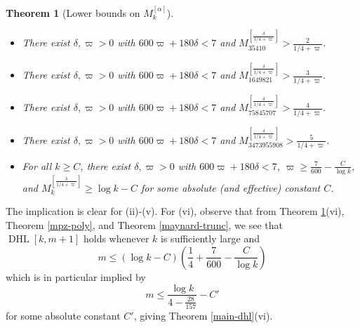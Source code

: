 \documentclass{bmcart}
\DeclareMathOperator*\DHL{DHL}
\theoremstyle{plain}
\newtheorem{theorem}{Theorem}[section]
\theoremstyle{definition}
\begin{document}
\begin{theorem}[Lower bounds on $M_k^{[\alpha]}$]\label{mlower-var}\
\begin{itemize}
\item[(ii)] There exist $\delta,\varpi>0$ with $600 \varpi + 180 \delta < 7$ and $M_{\num{35410}}^{[\frac{\delta}{1/4+\varpi}]} > \frac{2}{1/4+\varpi}$.
\item[(iii)] There exist $\delta,\varpi>0$ with $600 \varpi + 180 \delta < 7$ and $M_{\num{1649821}}^{[\frac{\delta}{1/4+\varpi}]} > \frac{3}{1/4+\varpi}$.
\item[(iv)] There exist $\delta,\varpi>0$ with $600 \varpi + 180 \delta < 7$ and $M_{\num{75845707}}^{[\frac{\delta}{1/4+\varpi}]} > \frac{4}{1/4+\varpi}$.
\item[(v)] There exist $\delta,\varpi>0$ with $600 \varpi + 180 \delta < 7$ and $M_{\num{3473955908}}^{[\frac{\delta}{1/4+\varpi}]} > \frac{5}{1/4+\varpi}$.
\item[(vi)] For all $k \geq C$, there exist $\delta,\varpi>0$ with $600 \varpi + 180 \delta < 7$, $\varpi \geq \frac{7}{600} - \frac{C}{\log k}$, and $M_k^{[\frac{\delta}{1/4+\varpi}]} \geq \log k - C$ for some absolute (and effective) constant $C$.
\end{itemize}
\end{theorem}

The implication is clear for (ii)-(v).  For (vi), observe that from Theorem \ref{mlower-var}(vi), Theorem \ref{mpz-poly}, and Theorem \ref{maynard-trunc}, we see that $\DHL[k,m+1]$ holds whenever $k$ is sufficiently large and
$$ m \leq (\log k - C) \left(\frac{1}{4} + \frac{7}{600} - \frac{C}{\log k}\right)$$
which is in particular implied by
$$ m \leq \frac{\log k}{4 - \frac{28}{157}} - C'$$
for some absolute constant $C'$, giving Theorem \ref{main-dhl}(vi).
\end{document}
